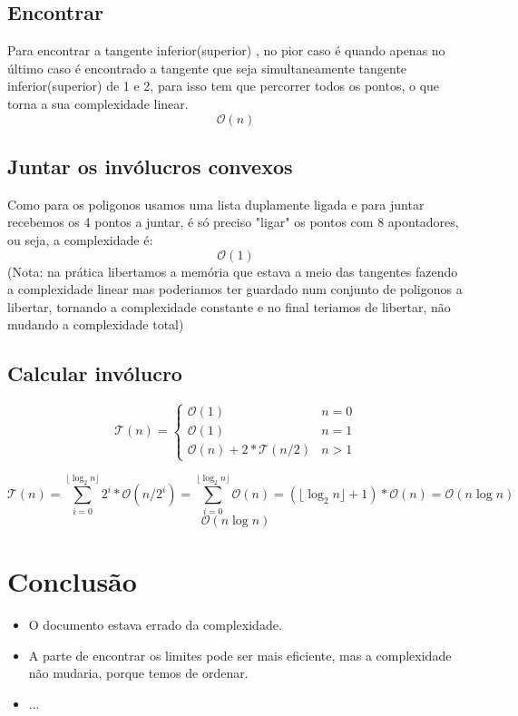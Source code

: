 \documentclass[11pt]{article}
\begin{document}
\subsection{Encontrar}
Para encontrar a tangente inferior(superior) ,
no pior caso é quando apenas no último caso é encontrado
a tangente que seja simultaneamente tangente inferior(superior)
de 1 e 2, para isso tem que percorrer todos os pontos,
o que torna a sua complexidade linear. 
$$\mathcal{O}(n)$$

\subsection{Juntar os invólucros convexos}
Como para os poligonos usamos uma lista duplamente ligada e
para juntar recebemos os 4 pontos a juntar, é só preciso 
"ligar" os pontos com 8 apontadores, ou seja, a complexidade é: 
$$\mathcal{O}(1)$$
(Nota: na prática libertamos a memória que estava 
a meio das tangentes fazendo a complexidade linear
mas poderiamos ter guardado num conjunto de poligonos 
a libertar, tornando a complexidade constante e no final 
teriamos de libertar, não mudando a complexidade total)

\subsection{Calcular invólucro}
$$
    \mathcal{T}(n) = 
        \begin{cases}
            \mathcal{O}(1)                      & n = 0\\
            \mathcal{O}(1)                      & n = 1\\
            \mathcal{O}(n) + 2*\mathcal{T}(n/2) & n > 1
        \end{cases}
$$

$$
    \mathcal{T}(n) = \sum_{i=0}^{\lfloor\log_{2}n\rfloor} 2^i*\mathcal{O}(n/2^i)
    = \sum_{i=0}^{\lfloor\log_{2}n\rfloor} \mathcal{O}(n)
    = (\lfloor\log_{2}n\rfloor + 1)*\mathcal{O}(n)
    = \mathcal{O}(n\log{n})
$$
$$
    \mathcal{O}(n\log{n})
$$


\section{Conclusão}
\begin{itemize}
    \item O documento estava errado da complexidade.
    \item A parte de encontrar os limites pode ser mais eficiente, 
        mas a complexidade não mudaria, porque temos de ordenar.
    \item ...
\end{itemize}
\end{document}
